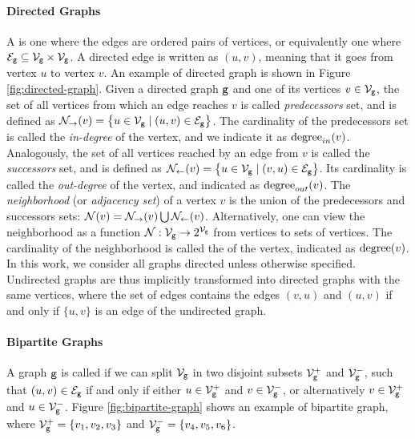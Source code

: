 \paragraph{Directed Graphs}
A  is one where the edges are ordered pairs of vertices, or equivalently one where $\Edges{g}\subseteq \Nodes{g}\times \Nodes{g}$. A directed edge is written as $(u, v)$, meaning that it goes from vertex $u$ to vertex $v$. An example of directed graph is shown in Figure \ref{fig:directed-graph}. Given a directed graph $\mathtt{g}$ and one of its vertices $v \in \Nodes{g}$, the set of all vertices from which an edge reaches $v$ is called \emph{predecessors} set, and is defined as $\Pred(v) = \Set{u \in \Nodes{g} \mid (u,v) \in \Edges{g}}$. The cardinality of the predecessors set is called the \emph{in-degree} of the vertex, and we indicate it as $\mathrm{degree}_{in}(v)$. Analogously, the set of all vertices reached by an edge from $v$ is called the \emph{successors} set, and is defined as $\Succ(v) = \Set{u \in \Nodes{g}\mid (v,u) \in \Edges{g}}$. Its cardinality is called the \emph{out-degree} of the vertex, and indicated as $\mathrm{degree}_{out}(v)$. The \emph{neighborhood} (or \emph{adjacency set}) of a vertex $v$ is the union of the predecessors and successors sets: $\Neigh(v) = \Pred(v) \bigcup \Succ(v)$. Alternatively, one can view the neighborhood as a function $\Neigh: \Nodes{g}\shortrightarrow 2^{\Nodes{g}}$ from vertices to sets of vertices. The cardinality of the neighborhood is called the  of the vertex, indicated as $\mathrm{degree}(v)$.  In this work, we consider all graphs directed unless otherwise specified. Undirected graphs are thus implicitly transformed into directed graphs with the same vertices, where the set of edges contains the edges $(v,u)$ and $(u,v)$ if and only if $\{u,v\}$ is an edge of the undirected graph.

\paragraph{Bipartite Graphs}
A graph $\mathtt{g}$ is called  if we can split $\Nodes{g}$ in two disjoint subsets $\Nodes{g}^{+}$ and $\Nodes{g}^{-}$, such that $(u, v) \in \Edges{g}$ if and only if either $u \in \Nodes{g}^{+}$ and $v \in \Nodes{g}^{-}$, or alternatively $v \in \Nodes{g}^{+}$ and $u \in \Nodes{g}^{-}$. Figure \ref{fig:bipartite-graph} shows an example of bipartite graph, where
$\Nodes{g}^{+} = \Set{v_1, v_2, v_3}$ and $\Nodes{g}^{-} = \Set{v_4, v_5, v_6}$.

